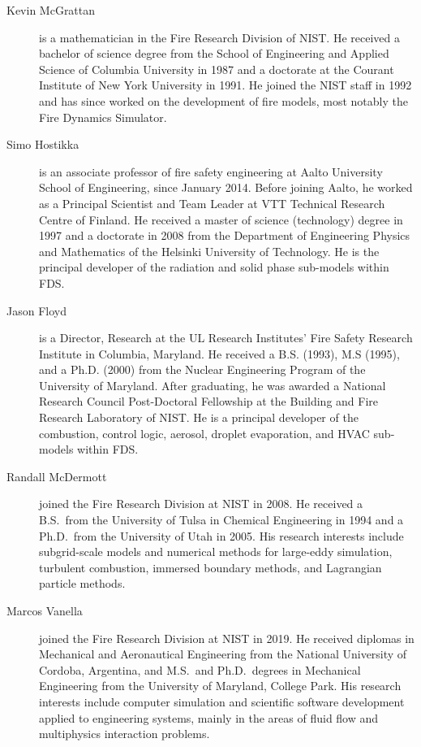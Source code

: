 \begin{description}

\item[Kevin McGrattan] is a mathematician in the Fire Research Division of NIST. He received a bachelor of science degree from the School of Engineering and Applied Science of Columbia University in 1987 and a doctorate at the Courant Institute of New York University in 1991. He joined the NIST staff in 1992 and has since worked on the development of fire models, most notably the Fire Dynamics Simulator.

\item[Simo Hostikka] is an associate professor of fire safety engineering at Aalto University School of Engineering, since January 2014. Before joining Aalto, he worked as a Principal Scientist and Team Leader at VTT Technical Research Centre of Finland. He received a master of science (technology) degree in 1997 and a doctorate in 2008 from the Department of Engineering Physics and Mathematics of the Helsinki University of Technology.  He is the principal developer of the radiation and solid phase sub-models within FDS.

\item[Jason Floyd] is a Director, Research at the UL Research Institutes' Fire Safety Research Institute in Columbia, Maryland. He received a B.S. (1993), M.S (1995), and a Ph.D. (2000) from the Nuclear Engineering Program of the University of Maryland. After graduating, he was awarded a National Research Council Post-Doctoral Fellowship at the Building and Fire Research Laboratory of NIST. He is a principal developer of the combustion, control logic, aerosol, droplet evaporation, and HVAC sub-models within FDS.

\item[Randall McDermott] joined the Fire Research Division at NIST in 2008. He received a B.S.~from the University of Tulsa in Chemical Engineering in 1994 and a Ph.D.~from the University of Utah in 2005. His research interests include subgrid-scale models and numerical methods for large-eddy simulation, turbulent combustion, immersed boundary methods, and Lagrangian particle methods.

\item[Marcos Vanella] joined the Fire Research Division at NIST in 2019. He received diplomas in Mechanical and Aeronautical Engineering from the National University of Cordoba, Argentina, and M.S.~and Ph.D.~degrees in Mechanical Engineering from the University of Maryland, College Park. His research interests include computer simulation and scientific software development applied to engineering systems, mainly in the areas of fluid flow and multiphysics interaction problems.


\end{description}

